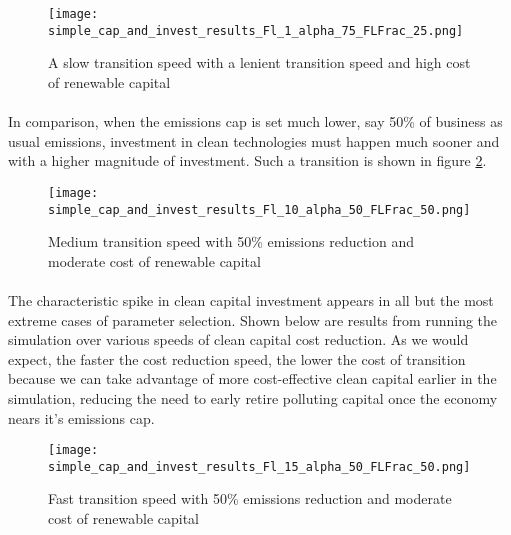 \documentclass{article}
\begin{document}
\begin{figure}[h]
\texttt{[image: simple\_cap\_and\_invest\_results\_Fl\_1\_alpha\_75\_FLFrac\_25.png]}
\caption{A slow transition speed with a lenient transition speed and high cost of renewable capital\label{fig:SimpleResultsA=75}}
\end{figure}



\FloatBarrier


\paragraph{} In comparison, when the emissions cap is set much lower, say 50\% of business as usual emissions, investment in clean technologies must happen much sooner and with a higher magnitude of investment. Such a transition is shown in figure \ref{fig:SimpleResultsA=25}. 

\begin{figure}[h]
\texttt{[image: simple\_cap\_and\_invest\_results\_Fl\_10\_alpha\_50\_FLFrac\_50.png]}
\caption{Medium transition speed with 50\% emissions reduction and moderate cost of renewable capital\label{fig:SimpleResultsA=25}}
\end{figure}


\FloatBarrier

\paragraph{} The characteristic spike in clean capital investment appears in all but the most extreme cases of parameter selection. Shown below are results from running the simulation over various speeds of clean capital cost reduction. As we would expect, the faster the cost reduction speed, the lower the cost of transition because we can take advantage of more cost-effective clean capital earlier in the simulation, reducing the need to early retire polluting capital once the economy nears it's emissions cap. 



\begin{figure}[h]
\texttt{[image: simple\_cap\_and\_invest\_results\_Fl\_15\_alpha\_50\_FLFrac\_50.png]}
\caption{Fast transition speed with 50\% emissions reduction and moderate cost of renewable capital\label{fig:SimpleResultsFl=1}}
\end{figure}

\FloatBarrier
\end{document}
